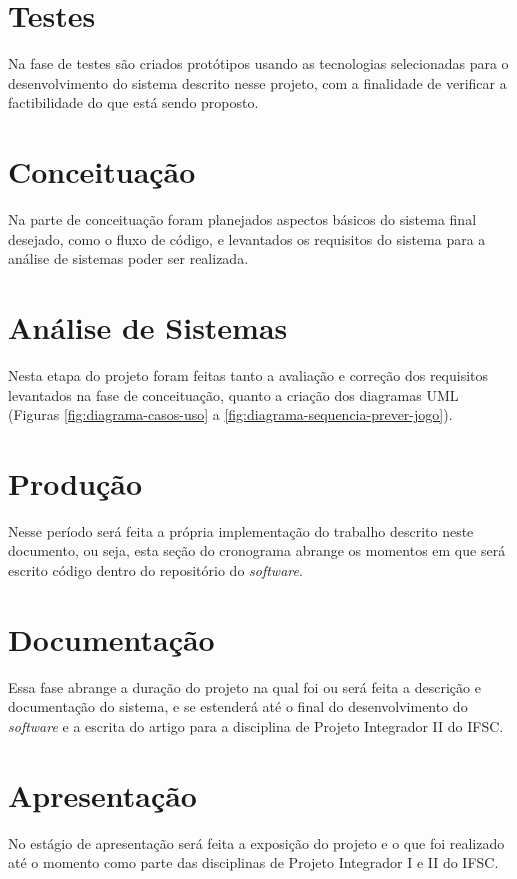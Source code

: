 \documentclass[brazilian]{ifsc-tcc}
\begin{document}
\section{Testes}
Na fase de testes são criados protótipos usando as tecnologias selecionadas para o desenvolvimento do sistema descrito nesse projeto, com a finalidade de verificar a factibilidade do que está sendo proposto.

\section{Conceituação}
Na parte de conceituação foram planejados aspectos básicos do sistema final desejado, como o fluxo de código, e levantados os requisitos do sistema para a análise de sistemas poder ser realizada.

\section{Análise de Sistemas}
Nesta etapa do projeto foram feitas tanto a avaliação e correção dos requisitos levantados na fase de conceituação, quanto a criação dos diagramas UML (Figuras \ref{fig:diagrama-casos-uso} a \ref{fig:diagrama-sequencia-prever-jogo}).

\section{Produção}
Nesse período será feita a própria implementação do trabalho descrito neste documento, ou seja, esta seção do cronograma abrange os momentos em que será escrito código dentro do repositório do \textit{software}.

\section{Documentação}
Essa fase abrange a duração do projeto na qual foi ou será feita a descrição e documentação do sistema, e se estenderá até o final do desenvolvimento do \textit{software} e a escrita do artigo para a disciplina de Projeto Integrador II do IFSC. 

\section{Apresentação}
No estágio de apresentação será feita a exposição do projeto e o que foi realizado até o momento como parte das disciplinas de Projeto Integrador I e II do IFSC.

\newpage
\end{document}
